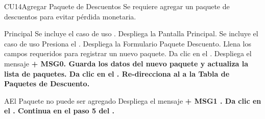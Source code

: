 \begin{UseCase}{CU14}{Agregar Paquete de Descuentos}{
		Se requiere agregar un paquete de descuentos para evitar pérdida monetaria.
	}
	\end{UseCase}
	\begin{UCtrayectoria}{Principal}
		\UCpaso Se incluye el caso de uso .
		\UCpaso Despliega la  {Pantalla Principal}.
		\UCpaso Se incluye el caso de uso 
		\UCpaso[\UCactor] Presiona el .
		\UCpaso Despliega la  {Formulario Paquete Descuento}.
		\UCpaso [\UCactor] Llena los campos requeridos para registrar un nuevo paquete. 
		\UCpaso[\UCactor] Da clic en el  .
		\UCpaso Despliega el mensaje \bf {+ MSG0}. 
		\UCpaso Guarda los datos del nuevo paquete y actualiza la lista de paquetes.
		\UCpaso[\UCactor] Da clic en el .
		\UCpaso Re-direcciona al \UCactor a la  {Tabla de Paquetes de Descuento}.
	\end{UCtrayectoria}


		\begin{UCtrayectoriaA}{A}{El Paquete no puede ser agregado}
			\UCpaso Despliega el mensaje \bf {+ MSG1 }.
			\UCpaso[\UCactor] Da clic en el .
			\UCpaso Continua en el paso 5 del .
		\end{UCtrayectoriaA}

